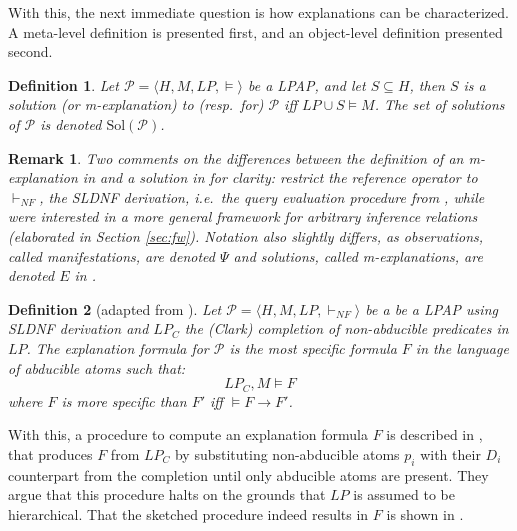 \documentclass[a4paper]{article}
\newcommand{\problem}{\ensuremath{\mathscr{P}}}
\newcommand{\entails}{\models}
\newcommand{\sol}{\mathrm{Sol}}
\newcommand{\sldnf}{\ensuremath{\vdash_{NF}}}
\newtheorem{definition}{Definition}
\newtheorem{remark}{Remark}
\begin{document}
With this, the next immediate question is how explanations can be characterized. A meta-level definition is presented first, and an object-level definition presented second.
\begin{definition}%
Let $\problem = \langle H, M, LP, \entails \rangle$ be a LPAP, and let $S \subseteq H$, then $S$ is a \emph{solution} (or \emph{m-explanation}) to (resp.~for) $\problem$ iff $LP \cup S \entails M$. The set of solutions of $\problem$ is denoted $\sol(\problem)$.
\end{definition}
\begin{remark}
Two comments on the differences between the definition of an m-ex\-pla\-na\-tion in \cite[Definition 3, p.~671]{DBLP:journals/logcom/ConsoleDT91} and a solution in \citep[Definition 2, p.~140]{DBLP:journals/tcs/EiterGL97} for clarity: \citet{DBLP:journals/logcom/ConsoleDT91} restrict the reference operator to $\sldnf$, the SLDNF derivation, i.e.~the query evaluation procedure from \citep{DBLP:conf/adbt/Clark77}, while \citet{DBLP:journals/tcs/EiterGL97} were interested in a more general framework for arbitrary inference relations (elaborated in Section \ref{sec:fw}).
Notation also slightly differs, as observations, called manifestations, are denoted $\Psi$ and solutions, called m-explanations, are denoted $E$ in \citep{DBLP:journals/logcom/ConsoleDT91}.
\end{remark}
\begin{definition}[adapted from {\cite[Definition 2, p.~669]{DBLP:journals/logcom/ConsoleDT91}}]
Let $\problem = \langle H, M, LP, \sldnf \rangle$ be a  be a LPAP using SLDNF derivation and $LP_C$ the (Clark) completion of non-abducible predicates in $LP$. The \emph{explanation formula} for $\problem$ is the most specific formula $F$ in the language of abducible atoms such that: $$LP_C, M \entails F$$ where $F$ is more specific than $F'$ iff $\entails F \to F'$.
\end{definition}
With this, a procedure to compute an explanation formula $F$ is described in \citep{DBLP:journals/logcom/ConsoleDT91}, that produces $F$ from $LP_C$ by substituting non-abducible atoms $p_i$ with their $D_i$ counterpart from the completion until only abducible atoms are present. They argue that this procedure halts on the grounds that $LP$ is assumed to be hierarchical. That the sketched procedure indeed results in $F$ is shown in \citep[Theorem 1]{DBLP:journals/logcom/ConsoleDT91}.
\end{document}

